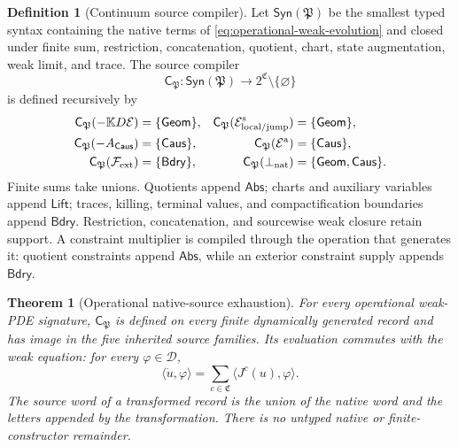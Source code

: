 \documentclass[11pt]{article}
\numberwithin{section}{part}
\theoremstyle{plain}
\newtheorem{theorem}{Theorem}[section]
\theoremstyle{definition}
\newtheorem{definition}[definition]{Definition}
\theoremstyle{remark}
\newcommand{\Geom}{\mathsf{Geom}}
\newcommand{\Caus}{\mathsf{Caus}}
\newcommand{\Abs}{\mathsf{Abs}}
\newcommand{\Lift}{\mathsf{Lift}}
\newcommand{\Bdry}{\mathsf{Bdry}}
\newcommand{\Channels}{\mathfrak C}
\newcommand{\Energy}{\mathcal E}
\begin{document}
\begin{definition}[Continuum source compiler]
\label{def:continuum-source-compiler}
Let \(\mathsf{Syn}(\mathfrak P)\) be the smallest typed syntax containing the
native terms of \eqref{eq:operational-weak-evolution} and closed under finite
sum, restriction, concatenation, quotient, chart, state augmentation, weak
limit, and trace.  The source compiler
\[
 \mathsf C_\mathfrak P:
 \mathsf{Syn}(\mathfrak P)\longrightarrow
 2^{\Channels}\setminus\{\varnothing\}
\]
is defined recursively by
\begin{align}
 \mathsf C_\mathfrak P(-\mathbb K D\Energy)
   &=\{\Geom\},&
 \mathsf C_\mathfrak P(\mathcal E^{\rm s}_{\rm local/jump})
   &=\{\Geom\},\nonumber\\
 \mathsf C_\mathfrak P(-A_{\Caus})
   &=\{\Caus\},&
 \mathsf C_\mathfrak P(\mathcal E^{\rm a})
   &=\{\Caus\},\label{eq:operational-source-compiler}\\
 \mathsf C_\mathfrak P(\mathcal F_{\rm ext})
   &=\{\Bdry\},&
 \mathsf C_\mathfrak P(\bot_{\rm nat})
   &=\{\Geom,\Caus\}.\nonumber
\end{align}
Finite sums take unions.  Quotients append \(\Abs\); charts and auxiliary
variables append \(\Lift\); traces, killing, terminal values, and
compactification boundaries append \(\Bdry\).  Restriction, concatenation,
and sourcewise weak closure retain support.  A constraint multiplier is
compiled through the operation that generates it: quotient constraints append
\(\Abs\), while an exterior constraint supply appends \(\Bdry\).
\end{definition}

\begin{theorem}[Operational native-source exhaustion]
\label{thm:operational-native-source-exhaustion}
For every operational weak-PDE signature, \(\mathsf C_\mathfrak P\) is
defined on every finite dynamically generated record and has image in the
five inherited source families.  Its evaluation commutes with the weak
equation: for every \(\varphi\in\mathcal D\),
\begin{equation}
 \label{eq:compiled-weak-current}
 \langle\dot u,\varphi\rangle
 =\sum_{c\in\Channels}\langle J^c(u),\varphi\rangle .
\end{equation}
The source word of a transformed record is the union of the native word and
the letters appended by the transformation.  There is no untyped native or
finite-constructor remainder.
\end{theorem}
\end{document}
